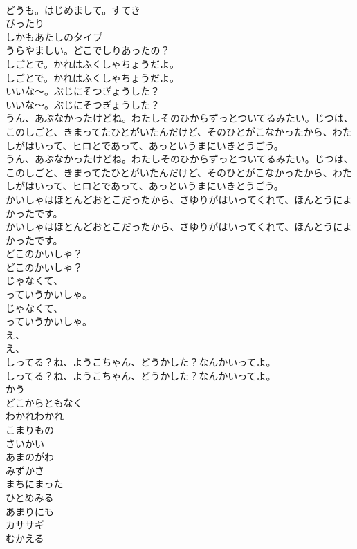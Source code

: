 \documentclass[8pt]{extreport}
\begin{document}
\begin{CJK}{UTF8}{min}
\\	どうも。はじめまして。すてき
\\	ぴったり
\\	しかもあたしのタイプ
\\	うらやましい。どこでしりあったの？
\\	しごとで。かれはふくしゃちょうだよ。
\\	しごとで。かれはふくしゃちょうだよ。
\\	いいな〜。ぶじにそつぎょうした？
\\	いいな〜。ぶじにそつぎょうした？
\\	うん、あぶなかったけどね。わたしそのひからずっとついてるみたい。じつは、このしごと、きまってたひとがいたんだけど、そのひとがこなかったから、わたしがはいって、ヒロとであって、あっというまにいきとうごう。
\\	うん、あぶなかったけどね。わたしそのひからずっとついてるみたい。じつは、このしごと、きまってたひとがいたんだけど、そのひとがこなかったから、わたしがはいって、ヒロとであって、あっというまにいきとうごう。
\\	かいしゃはほとんどおとこだったから、さゆりがはいってくれて、ほんとうによかったです。
\\	かいしゃはほとんどおとこだったから、さゆりがはいってくれて、ほんとうによかったです。
\\	どこのかいしゃ？
\\	どこのかいしゃ？
\\	じゃなくて、
\\	っていうかいしゃ。
\\	じゃなくて、
\\	っていうかいしゃ。
\\	え、
\\	え、
\\	しってる？ね、ようこちゃん、どうかした？なんかいってよ。
\\	しってる？ね、ようこちゃん、どうかした？なんかいってよ。
\\	かう
\\	どこからともなく
\\	わかれわかれ
\\	こまりもの
\\	さいかい
\\	あまのがわ
\\	みずかさ
\\	まちにまった
\\	ひとめみる
\\	あまりにも
\\	カササギ
\\	むかえる

\end{CJK}
\end{document}
